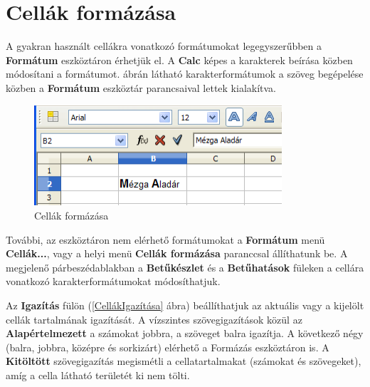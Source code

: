\section{Cellák formázása}

A gyakran használt cellákra vonatkozó formátumokat
legegyszerűbben a \textbf{Formátum} eszköztáron érhetjük
el. A \textbf{Calc} képes a karakterek beírása közben
módosítani a formátumot.  ábrán látható
karakterformátumok a szöveg begépelése közben a
\textbf{Formátum} eszköztár parancsaival lettek kialakítva.

\begin{figure}[!h]
\begin{center}
\includegraphics[width=9.206cm]{oocalcv2-img11.png}
\caption{Cellák formázása}\label{CellákFormázása}
\end{center}
\end{figure}

További, az eszköztáron nem elérhető formátumokat a
\textbf{Formátum} menü \textbf{Cellák...}, vagy a helyi menü
\textbf{Cellák formázása} paranccsal állíthatunk be. A
megjelenő párbeszédablakban a \textbf{Betűkészlet} és a
\textbf{Betűhatások} füleken a cellára vonatkozó
karakterformátumokat módosíthatjuk. 

Az \textbf{Igazítás} fülön (\ref{CellákIgazítása} ábra) beállíthatjuk az
aktuális vagy a kijelölt cellák tartalmának igazítását. A
vízszintes szövegigazítások közül az
\textbf{Alapértelmezett} a számokat jobbra, a szöveget balra
igazítja. A következő négy (balra, jobbra, középre és
sorkizárt) elérhető a Formázás eszköztáron is. A
\textbf{Kitöltött} szövegigazítás megismétli a
cellatartalmakat (számokat és szövegeket), amíg a cella
látható területét ki nem tölti.

